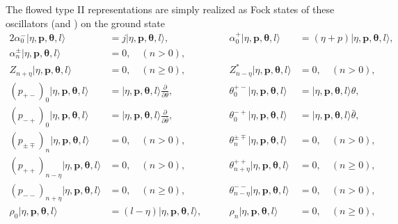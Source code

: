 \documentclass[a4paper,seceq,preprint]{ptptex}
\begin{document}
The flowed type II representations are simply realized as 
Fock states of these oscillators (and \coordHE{}) on the ground state
 \begin{alignat}{2}  
 \alpha^-_0|\eta,\boldsymbol p,\boldsymbol\theta,l\rangle&=
j|\eta,\boldsymbol p,\boldsymbol\theta,l\rangle,&\qquad
 \alpha^+_0|\eta,\boldsymbol p,\boldsymbol\theta,l\rangle&=
(\eta+p)|\eta,\boldsymbol p,\boldsymbol\theta,l\rangle,\nonumber\\
 \alpha^\pm_n|\eta,\boldsymbol p,\boldsymbol\theta,l\rangle&=0,\quad
  (n>0),&&
\nonumber\\
 Z_{n+\eta}|\eta,\boldsymbol p,\boldsymbol\theta,l\rangle&=0,\quad (n\ge 0),&\qquad
 Z^*_{n-\eta}|\eta,\boldsymbol p,\boldsymbol\theta,l\rangle&=0,\quad
  (n>0),
\nonumber\\
 (p_{+-})_0|\eta,\boldsymbol p,\boldsymbol\theta,l\rangle&=
|\eta,\boldsymbol p,\boldsymbol\theta,l\rangle\frac{\partial}{\partial\theta},&\qquad
 \theta^{+-}_0|\eta,\boldsymbol p,\boldsymbol\theta,l\rangle&=
|\eta,\boldsymbol p,\boldsymbol\theta,l\rangle\theta,\nonumber\\
 (p_{-+})_0|\eta,\boldsymbol p,\boldsymbol\theta,l\rangle&=|\eta,\boldsymbol
  p,\boldsymbol\theta,l\rangle\frac{\partial}{\partial\bar\theta},
&\qquad
 \theta^{-+}_0|\eta,\boldsymbol p,\boldsymbol\theta,l\rangle&=
|\eta,\boldsymbol p,\boldsymbol\theta,l\rangle\bar\theta,\nonumber\\
 (p_{\pm\mp})_n|\eta,\boldsymbol p,\boldsymbol\theta,l\rangle&=0,\quad (n> 0),&\qquad
 \theta^{\pm\mp}_n|\eta,\boldsymbol
  p,\boldsymbol\theta,l\rangle&=0,\quad (n>0),
\nonumber\\
 (p_{++})_{n-\eta}|\eta,\boldsymbol p,\boldsymbol\theta,l\rangle&=0,
\quad (n>0),
&\qquad
 \theta^{++}_{n+\eta}|\eta,\boldsymbol p,\boldsymbol\theta,l\rangle&=0,
\quad (n\ge 0),\nonumber\\
 (p_{--})_{n+\eta}|\eta,\boldsymbol p,\boldsymbol\theta,l\rangle&=0,
\quad (n\ge 0),&\qquad
 \theta^{--}_{n-\eta}|\eta,\boldsymbol
  p,\boldsymbol\theta,l\rangle&=0,\quad (n>0),\nonumber\\
 \rho_0|\eta,\boldsymbol p,\boldsymbol\theta,l\rangle&=
(l-\eta)|\eta,\boldsymbol p,\boldsymbol\theta,l\rangle,&\qquad
 \rho_n|\eta,\boldsymbol p,\boldsymbol\theta,l\rangle&=0,\quad (n\ge0),
\label{ffgs}
 \end{alignat}
\end{document}
